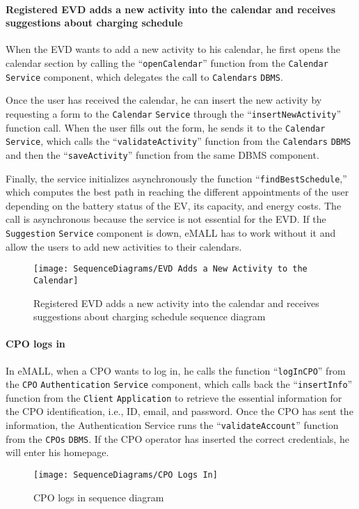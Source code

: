 \paragraph{Registered EVD adds a new activity into the calendar and receives suggestions about charging schedule}
When the EVD wants to add a new activity to his calendar, he first opens the calendar section by calling the ``\verb|openCalendar|'' function from the \verb|Calendar| \verb|Service| component, which delegates the call to \verb|Calendars| \verb|DBMS|\@.

Once the user has received the calendar, he can insert the new activity by requesting a form to the \verb|Calendar| \verb|Service| through the ``\verb|insertNewActivity|'' function call.
When the user fills out the form, he sends it to the \verb|Calendar| \verb|Service|, which calls the ``\verb|validateActivity|'' function from the \verb|Calendars| \verb|DBMS| and then the ``\verb|saveActivity|'' function from the same DBMS component.

Finally, the service initializes asynchronously the function ``\verb|findBestSchedule|,'' which computes the best path in reaching the different appointments of the user depending on the battery status of the EV, its capacity, and energy costs.
The call is asynchronous because the service is not essential for the EVD\@.
If the \verb|Suggestion| \verb|Service| component is down, eMALL has to work without it and allow the users to add new activities to their calendars.
\begin{figure}[H]
    \begin{center}
        \texttt{[image: SequenceDiagrams/EVD Adds a New Activity to the Calendar]}
        \caption{Registered EVD adds a new activity into the calendar and receives suggestions about charging schedule sequence diagram}
        \label{Registered EVD adds a new activity into the calendar and receives suggestions about charging schedule sequence diagram}
    \end{center}
\end{figure}

\paragraph{CPO logs in}
In eMALL, when a CPO wants to log in, he calls the function ``\verb|logInCPO|'' from the \verb|CPO| \verb|Authentication| \verb|Service| component, which calls back the ``\verb|insertInfo|'' function from the \verb|Client| \verb|Application| to retrieve the essential information for the CPO identification, i.e., ID, email, and password.
Once the CPO has sent the information, the Authentication Service runs the ``\verb|validateAccount|'' function from the \verb|CPOs| \verb|DBMS|\@.
If the CPO operator has inserted the correct credentials, he will enter his homepage.
\begin{figure}[H]
    \begin{center}
        \texttt{[image: SequenceDiagrams/CPO Logs In]}
        \caption{CPO logs in sequence diagram}
        \label{cpo_logs_in}
    \end{center}
\end{figure}

